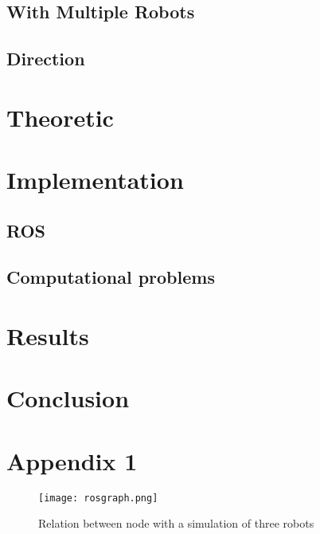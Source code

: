 \documentclass[12pt]{report} %
\begin{document}
\section{With Multiple Robots}

\section{Direction}


\chapter{Theoretic}

\chapter{Implementation}
\section{ROS}

\section{Computational problems}

\chapter{Results}\label{ch:results}

\chapter*{Conclusion}

\chapter{Appendix 1}

\begin{figure}[H]
\centering
\texttt{[image: rosgraph.png]}
\caption{Relation between node with a simulation of three robots}
\label{fig:completeNode}
\end{figure}
\end{document}
